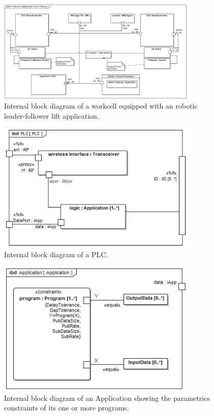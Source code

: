 \begin{figure}[!th]
	\centering
	\includegraphics[width=0.85\textwidth]{chapter-conclusions/images/NIST-IWS-FTFollower}
	\caption{Internal block diagram of a workcell equipped with an robotic leader-follower lift application.}
	\label{fig:concl:lfscenario-full}
\end{figure}

\begin{figure}[!th]
	\centering
	\includegraphics[width=0.85\textwidth]{chapter-conclusions/images/PLC}
	\caption{Internal block diagram of a PLC.}
	\label{fig:concl:plc-ibd}
\end{figure}

\begin{figure}[!th]
	\centering
	\includegraphics[width=0.85\textwidth]{chapter-conclusions/images/Application}
	\caption{Internal block diagram of an Application showing the parametrics constraints of its one or more programs.}
	\label{fig:concl:Application-ibd}
\end{figure}

